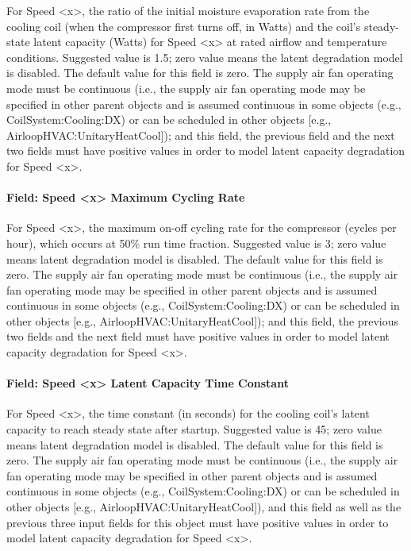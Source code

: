For Speed \textless{}x\textgreater{}, the ratio of the initial moisture evaporation rate from the cooling coil (when the compressor first turns off, in Watts) and the coil's steady-state latent capacity (Watts) for Speed \textless{}x\textgreater{} at rated airflow and temperature conditions. Suggested value is 1.5; zero value means the latent degradation model is disabled. The default value for this field is zero. The supply air fan operating mode must be continuous (i.e., the supply air fan operating mode may be specified in other parent objects and is assumed continuous in some objects (e.g., CoilSystem:Cooling:DX) or can be scheduled in other objects {[}e.g., AirloopHVAC:UnitaryHeatCool{]}); and this field, the previous field and the next two fields must have positive values in order to model latent capacity degradation for Speed \textless{}x\textgreater{}.

\paragraph{Field: Speed \textless{}x\textgreater{} Maximum Cycling Rate}\label{field-speed-x-maximum-cycling-rate}

For Speed \textless{}x\textgreater{}, the maximum on-off cycling rate for the compressor (cycles per hour), which occurs at 50\% run time fraction. Suggested value is 3; zero value means latent degradation model is disabled. The default value for this field is zero. The supply air fan operating mode must be continuous (i.e., the supply air fan operating mode may be specified in other parent objects and is assumed continuous in some objects (e.g., CoilSystem:Cooling:DX) or can be scheduled in other objects {[}e.g., AirloopHVAC:UnitaryHeatCool{]}); and this field, the previous two fields and the next field must have positive values in order to model latent capacity degradation for Speed \textless{}x\textgreater{}.

\paragraph{Field: Speed \textless{}x\textgreater{} Latent Capacity Time Constant}\label{field-speed-x-latent-capacity-time-constant}

For Speed \textless{}x\textgreater{}, the time constant (in seconds) for the cooling coil's latent capacity to reach steady state after startup. Suggested value is 45; zero value means latent degradation model is disabled. The default value for this field is zero. The supply air fan operating mode must be continuous (i.e., the supply air fan operating mode may be specified in other parent objects and is assumed continuous in some objects (e.g., CoilSystem:Cooling:DX) or can be scheduled in other objects {[}e.g., AirloopHVAC:UnitaryHeatCool{]}), and this field as well as the previous three input fields for this object must have positive values in order to model latent capacity degradation for Speed \textless{}x\textgreater{}.


